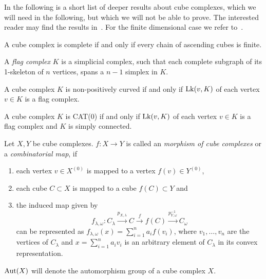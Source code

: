 In the following is a short list of deeper results about cube complexes, which we will need in the following, but which we will not be able to prove. The interested reader may find the results in~\cite[Appendices A, B]{MR3029427}. For the finite dimensional case we refer to~\cite[Sec. I.7, II.5]{MR1744486}.

\begin{thm}
  A cube complex is complete if and only if every chain of ascending cubes is finite.
\end{thm}


\begin{defin}
  A \emph{flag complex} \(K\) is a simplicial complex, such that each complete subgraph of its 1-skeleton of \(n\) vertices, spans a \(n-1\) simplex in \(K\).
\end{defin}

\begin{thm}
  A cube complex \(K\) is non-positively curved if and only if \(\operatorname{Lk}(v,K)\) of each vertex \(v \in K\) is a flag complex.

  A cube complex \(K\) is CAT(0) if and only if \(\operatorname{Lk}(v,K)\) of each vertex \(v \in K\) is a flag complex and \(K\) is simply connected.
\end{thm}

\begin{defin}
  Let \(X,Y\) be cube complexes. \(f\colon X \to Y\) is called an \emph{morphism of cube complexes} or a \emph{combinatorial map}, if
  \begin{enumerate}
  \item each vertex \(v \in X^{(0)}\) is mapped to a vertex \(f(v) \in Y^{(0)}\),
  \item each cube \(C \subset X\) is mapped to a cube \(f(C) \subset Y\) and
  \item the induced map given by
    \[
      f_{\lambda, \omega}\colon C_\lambda \xrightarrow{p_{X,\lambda}} C \xrightarrow{f} f(C) \xrightarrow{p^{-1}_{Y,\omega}} C_\omega
    \]
    can be represented as \(f_{\lambda,\omega}(x) = \sum_{i=1}^n a_i f(v_i)\), where \(v_1, \dots, v_n\) are the vertices of \(C_\lambda\) and \(x = \sum_{i=1}^n a_i v_i\) is an arbitrary element of \(C_\lambda\) in its convex representation.
  \end{enumerate}
  \(\operatorname{Aut}(X)\) will denote the automorphism group of a cube complex \(X\).
\end{defin}

